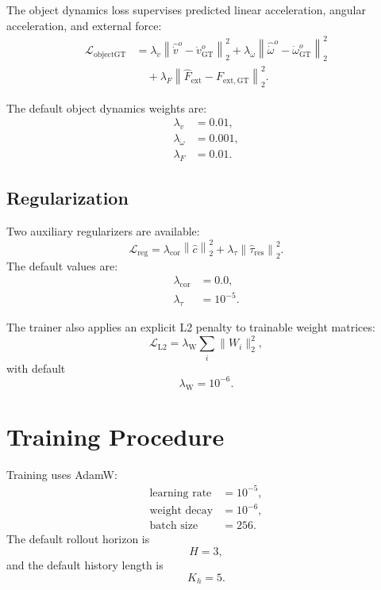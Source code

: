 \documentclass[11pt]{article}
\begin{document}
The object dynamics loss supervises predicted linear acceleration, angular
acceleration, and external force:
\begin{align}
  \mathcal{L}_{\mathrm{objectGT}}
  &=
  \lambda_{\dot{v}}
  \left\|
    \hat{\dot{v}}^o - \dot{v}^o_{\mathrm{GT}}
  \right\|_2^2
  +
  \lambda_{\dot{\omega}}
  \left\|
    \hat{\dot{\omega}}^o - \dot{\omega}^o_{\mathrm{GT}}
  \right\|_2^2 \nonumber \\
  &\quad+
  \lambda_F
  \left\|
    \hat{F}_{\mathrm{ext}} -
    F_{\mathrm{ext,GT}}
  \right\|_2^2.
\end{align}

The default object dynamics weights are:
\begin{align}
  \lambda_{\dot{v}} &= 0.01, \\
  \lambda_{\dot{\omega}} &= 0.001, \\
  \lambda_F &= 0.01.
\end{align}

\subsection{Regularization}

Two auxiliary regularizers are available:
\begin{equation}
  \mathcal{L}_{\mathrm{reg}}
  =
  \lambda_{\mathrm{cor}}
  \left\|
    \hat{c}
  \right\|_2^2
  +
  \lambda_{\tau}
  \left\|
    \hat{\tau}_{\mathrm{res}}
  \right\|_2^2.
\end{equation}
The default values are:
\begin{align}
  \lambda_{\mathrm{cor}} &= 0.0, \\
  \lambda_{\tau} &= 10^{-5}.
\end{align}

The trainer also applies an explicit L2 penalty to trainable weight matrices:
\begin{equation}
  \mathcal{L}_{\mathrm{L2}}
  =
  \lambda_{\mathrm{W}}
  \sum_i
  \|W_i\|_2^2,
\end{equation}
with default
\begin{equation}
  \lambda_{\mathrm{W}} = 10^{-6}.
\end{equation}

\section{Training Procedure}

Training uses AdamW:
\begin{align}
  \text{learning rate} &= 10^{-5}, \\
  \text{weight decay} &= 10^{-6}, \\
  \text{batch size} &= 256.
\end{align}
The default rollout horizon is
\begin{equation}
  H = 3,
\end{equation}
and the default history length is
\begin{equation}
  K_h = 5.
\end{equation}
\end{document}
